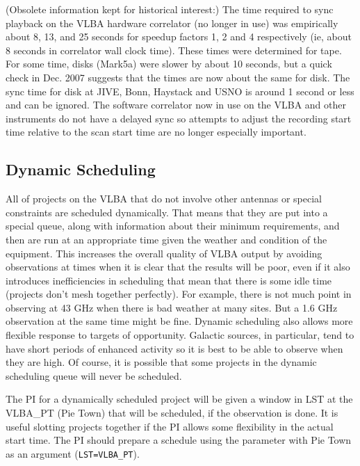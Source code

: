 \documentclass{report}
\begin{document}
(Obsolete information kept for historical interest:) The time required
to sync playback on the VLBA hardware correlator (no longer in use)
was empirically about 8, 13, and 25 seconds for speedup factors 1, 2
and 4 respectively (ie, about 8 seconds in correlator wall clock
time).  These times were determined for tape.  For some time, disks
(Mark5a) were slower by about 10 seconds, but a quick check in
Dec. 2007 suggests that the times are now about the same for disk.
The sync time for disk at JIVE, Bonn, Haystack and USNO is around 1
second or less and can be ignored.  The software correlator now in use
on the VLBA and other instruments do not have a delayed sync so
attempts to adjust the recording start time relative to the scan start
time are no longer especially important.


\subsection{\label{SSEC:DYNAMIC}Dynamic Scheduling}

All of projects on the VLBA that do not involve other antennas or special
constraints are scheduled dynamically.
That means that they are put into a special queue, along with information
about their minimum requirements, and then are run at an appropriate
time given the weather and condition of the equipment.  This
increases the overall quality of VLBA output by avoiding observations
at times when it is clear that the results will be poor, even if it
also introduces inefficiencies in scheduling that mean that there is
some idle time (projects don't mesh together perfectly).  For example,
there is not much point in observing at 43 GHz when there is bad weather
at many sites.  But a 1.6 GHz observation at the same time might be fine.
Dynamic scheduling also allows more flexible response to targets of
opportunity.  Galactic sources, in particular, tend to have short
periods of enhanced activity so it is best to be able to observe when
they are high.  Of course, it is possible that some projects in the
dynamic scheduling queue will never be scheduled.

The PI for a dynamically scheduled project will be given a window in
LST at the VLBA\_PT (Pie Town) that will be scheduled, if the
observation is done.  It is useful slotting projects together if the
PI allows some flexibility in the actual start time.  The PI should
prepare a schedule using the  parameter with Pie
Town as an argument ({\tt LST=VLBA\_PT}).
\end{document}
